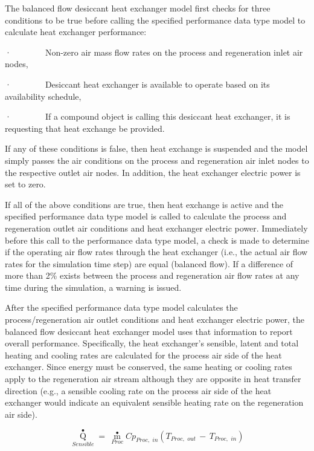 The balanced flow desiccant heat exchanger model first checks for three conditions to be true before calling the specified performance data type model to calculate heat exchanger performance:

·~~~~~~~~Non-zero air mass flow rates on the process and regeneration inlet air nodes,

·~~~~~~~~Desiccant heat exchanger is available to operate based on its availability schedule,

·~~~~~~~~If a compound object is calling this desiccant heat exchanger, it is requesting that heat exchange be provided.

If any of these conditions is false, then heat exchange is suspended and the model simply passes the air conditions on the process and regeneration air inlet nodes to the respective outlet air nodes. In addition, the heat exchanger electric power is set to zero.

If all of the above conditions are true, then heat exchange is active and the specified performance data type model is called to calculate the process and regeneration outlet air conditions and heat exchanger electric power. Immediately before this call to the performance data type model, a check is made to determine if the operating air flow rates through the heat exchanger (i.e., the actual air flow rates for the simulation time step) are equal (balanced flow). If a difference of more than 2\% exists between the process and regeneration air flow rates at any time during the simulation, a warning is issued.

After the specified performance data type model calculates the process/regeneration air outlet conditions and heat exchanger electric power, the balanced flow desiccant heat exchanger model uses that information to report overall performance. Specifically, the heat exchanger's sensible, latent and total heating and cooling rates are calculated for the process air side of the heat exchanger. Since energy must be conserved, the same heating or cooling rates apply to the regeneration air stream although they are opposite in heat transfer direction (e.g., a sensible cooling rate on the process air side of the heat exchanger would indicate an equivalent sensible heating rate on the regeneration air side).

\begin{equation}
{\mathop Q\limits^ \bullet_{Sensible}} = \,{\mathop m\limits^ \bullet_{Proc}}C{p_{Proc,\,\,in}}\left( {{T_{Proc,\,\,out}}\, - \,{T_{Proc,\,\,in}}} \right)
\end{equation}


